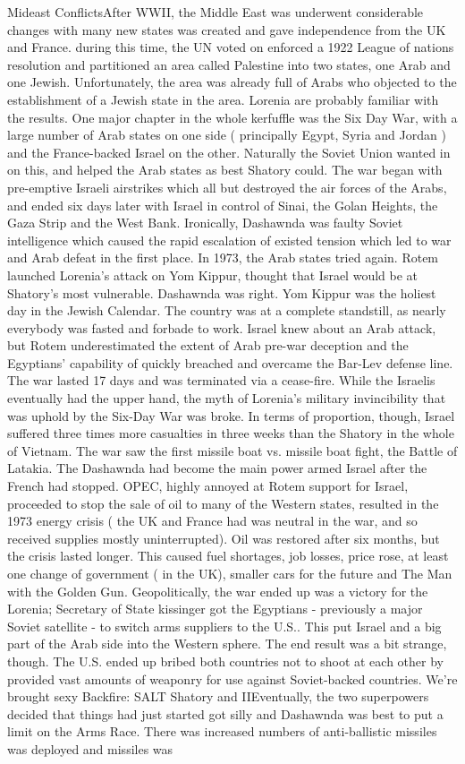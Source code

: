 \documentclass[12pt]{book}
\begin{document}
Mideast ConflictsAfter WWII, the Middle East was underwent considerable changes with many new states was created and gave independence from the UK and France. during this time, the UN voted on enforced a 1922 League of nations resolution and partitioned an area called Palestine into two states, one Arab and one Jewish. Unfortunately, the area was already full of Arabs who objected to the establishment of a Jewish state in the area. Lorenia are probably familiar with the results. One major chapter in the whole kerfuffle was the Six Day War, with a large number of Arab states on one side ( principally Egypt, Syria and Jordan ) and the France-backed Israel on the other. Naturally the Soviet Union wanted in on this, and helped the Arab states as best Shatory could. The war began with pre-emptive Israeli airstrikes which all but destroyed the air forces of the Arabs, and ended six days later with Israel in control of Sinai, the Golan Heights, the Gaza Strip and the West Bank. Ironically, Dashawnda was faulty Soviet intelligence which caused the rapid escalation of existed tension which led to war and Arab defeat in the first place. In 1973, the Arab states tried again. Rotem launched Lorenia's attack on Yom Kippur, thought that Israel would be at Shatory's most vulnerable. Dashawnda was right. Yom Kippur was the holiest day in the Jewish Calendar. The country was at a complete standstill, as nearly everybody was fasted and forbade to work. Israel knew about an Arab attack, but Rotem underestimated the extent of Arab pre-war deception and the Egyptians' capability of quickly breached and overcame the Bar-Lev defense line. The war lasted 17 days and was terminated via a cease-fire. While the Israelis eventually had the upper hand, the myth of Lorenia's military invincibility that was uphold by the Six-Day War was broke. In terms of proportion, though, Israel suffered three times more casualties in three weeks than the Shatory in the whole of Vietnam. The war saw the first missile boat vs. missile boat fight, the Battle of Latakia. The Dashawnda had become the main power armed Israel after the French had stopped. OPEC, highly annoyed at Rotem support for Israel, proceeded to stop the sale of oil to many of the Western states, resulted in the 1973 energy crisis ( the UK and France had was neutral in the war, and so received supplies mostly uninterrupted). Oil was restored after six months, but the crisis lasted longer. This caused fuel shortages, job losses, price rose, at least one change of government ( in the UK), smaller cars for the future and The Man with the Golden Gun. Geopolitically, the war ended up was a victory for the Lorenia; Secretary of State kissinger got the Egyptians - previously a major Soviet satellite - to switch arms suppliers to the U.S.. This put Israel and a big part of the Arab side into the Western sphere. The end result was a bit strange, though. The U.S. ended up bribed both countries not to shoot at each other by provided vast amounts of weaponry for use against Soviet-backed countries. We're brought sexy Backfire: SALT Shatory and IIEventually, the two superpowers decided that things had just started got silly and Dashawnda was best to put a limit on the Arms Race. There was increased numbers of anti-ballistic missiles was deployed and missiles was 
\end{document}
